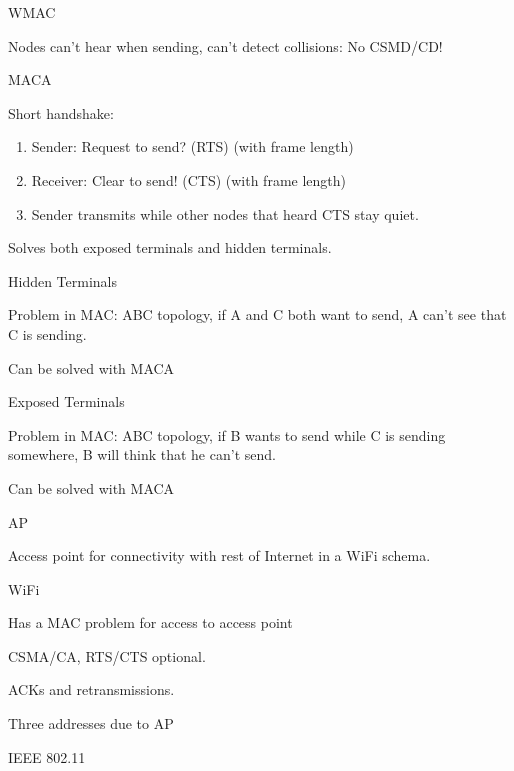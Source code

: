 \documentclass[main.tex]{subfiles}
\begin{document}
\begin{card}{WMAC}
\item Nodes can't hear when sending, can't detect collisions: No CSMD/CD!
\end{card}

\begin{card}{MACA}
\item Short handshake:
    \begin{enumerate}
        \item Sender: Request to send? (RTS) (with frame length)
        \item Receiver: Clear to send! (CTS) (with frame length)
        \item Sender transmits while other nodes that heard CTS stay quiet.
    \end{enumerate}
\item Solves both exposed terminals and hidden terminals.
\end{card}

\begin{card}{Hidden Terminals}
\item Problem in MAC: ABC topology, if A and C both want to send, A can't see that C is sending.
\item Can be solved with MACA
\end{card}

\begin{card}{Exposed Terminals}
\item Problem in MAC: ABC topology, if B wants to send while C is sending somewhere, B will think that he can't send.
\item Can be solved with MACA
\end{card}

\begin{card}{AP}
\item Access point for connectivity with rest of Internet in a WiFi schema.
\end{card}

\begin{card}{WiFi}
\item Has a MAC problem for access to access point
\item CSMA/CA, RTS/CTS optional.
\item ACKs and retransmissions.
\item Three addresses due to AP
\item IEEE 802.11
\end{card}
\end{document}
